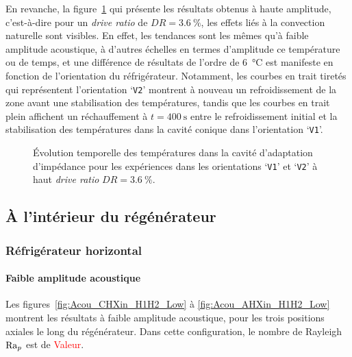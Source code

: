 En revanche, la figure~\ref{fig:Acou_CHXout_V1V2_High} qui présente les résultats obtenus à haute amplitude, c'est-à-dire pour un \textit{drive ratio} de $DR=\qty{3.6}{\percent}$, les effets liés à la convection naturelle sont visibles. En effet, les tendances sont les mêmes qu'à faible amplitude acoustique, à d'autres échelles en termes d'amplitude ce température ou de temps, et une différence de résultats de l'ordre de \qty{6}{\degreeCelsius} est manifeste en fonction de l'orientation du réfrigérateur. Notamment, les courbes en trait tiretés qui représentent l'orientation `\texttt{V2}' montrent à nouveau un refroidissement de la zone avant une stabilisation des températures, tandis que les courbes en trait plein affichent un réchauffement à $t=\qty{400}{\second}$ entre le refroidissement initial et la stabilisation des températures dans la cavité conique dans l'orientation `\texttt{V1}'.

\begin{figure}[!ht]
    \centering
    
    \caption{\'Evolution temporelle des températures dans la cavité d'adaptation d'impédance pour les expériences dans les orientations `\texttt{V1}' et `\texttt{V2}' à haut \textit{drive ratio} $DR=\qty{3.6}{\percent}$.}
    \label{fig:Acou_CHXout_V1V2_High}
\end{figure}



\subsection{À l'intérieur du régénérateur}
\subsubsection{Réfrigérateur horizontal}
\paragraph{Faible amplitude acoustique}
Les figures~\ref{fig:Acou_CHXin_H1H2_Low} à \ref{fig:Acou_AHXin_H1H2_Low} montrent les résultats à faible amplitude acoustique, pour les trois positions axiales le long du régénérateur. Dans cette configuration, le nombre de Rayleigh $\mathrm{Ra}_p$ est de \textcolor{red}{Valeur}. 

